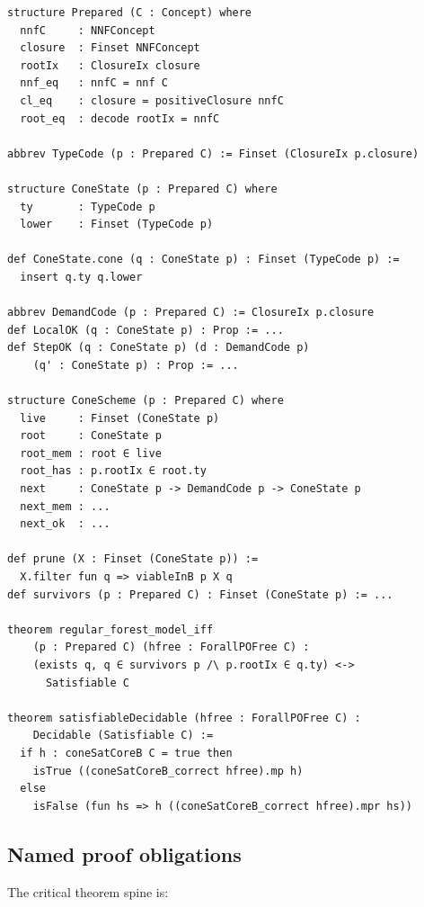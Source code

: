 \documentclass[11pt]{article}
\begin{document}
\begin{lstlisting}
structure Prepared (C : Concept) where
  nnfC     : NNFConcept
  closure  : Finset NNFConcept
  rootIx   : ClosureIx closure
  nnf_eq   : nnfC = nnf C
  cl_eq    : closure = positiveClosure nnfC
  root_eq  : decode rootIx = nnfC

abbrev TypeCode (p : Prepared C) := Finset (ClosureIx p.closure)

structure ConeState (p : Prepared C) where
  ty       : TypeCode p
  lower    : Finset (TypeCode p)

def ConeState.cone (q : ConeState p) : Finset (TypeCode p) :=
  insert q.ty q.lower

abbrev DemandCode (p : Prepared C) := ClosureIx p.closure
def LocalOK (q : ConeState p) : Prop := ...
def StepOK (q : ConeState p) (d : DemandCode p)
    (q' : ConeState p) : Prop := ...

structure ConeScheme (p : Prepared C) where
  live     : Finset (ConeState p)
  root     : ConeState p
  root_mem : root ∈ live
  root_has : p.rootIx ∈ root.ty
  next     : ConeState p -> DemandCode p -> ConeState p
  next_mem : ...
  next_ok  : ...

def prune (X : Finset (ConeState p)) :=
  X.filter fun q => viableInB p X q
def survivors (p : Prepared C) : Finset (ConeState p) := ...

theorem regular_forest_model_iff
    (p : Prepared C) (hfree : ForallPOFree C) :
    (exists q, q ∈ survivors p /\ p.rootIx ∈ q.ty) <->
      Satisfiable C

theorem satisfiableDecidable (hfree : ForallPOFree C) :
    Decidable (Satisfiable C) :=
  if h : coneSatCoreB C = true then
    isTrue ((coneSatCoreB_correct hfree).mp h)
  else
    isFalse (fun hs => h ((coneSatCoreB_correct hfree).mpr hs))
\end{lstlisting}

\subsection{Named proof obligations}

The critical theorem spine is:
\end{document}
